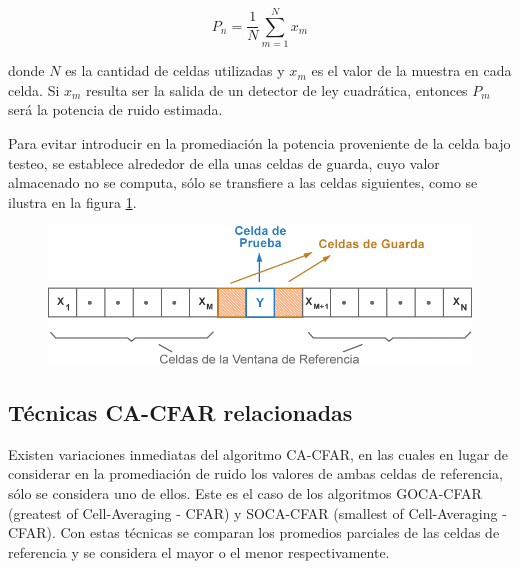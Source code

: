 \begin{equation}
P_{n} = \dfrac{1}{N} \sum_{m=1}^{N} x_m
\end{equation}

donde \(N\) es la cantidad de celdas utilizadas y \(x_{m}\) es el valor de la muestra en cada celda. Si \(x_{m}\) resulta ser la salida de un detector de ley cuadrática, entonces \(P_{m}\) será la potencia de ruido estimada.

Para evitar introducir en la promediación la potencia proveniente de la celda bajo testeo, se establece alrededor de ella unas celdas de guarda, cuyo valor almacenado no se computa, sólo se transfiere a las celdas siguientes, como se ilustra en la figura \ref{estructura_cfar}.


\begin{figure}
\centering
\includegraphics[scale=0.5]{./Figures/Estructura-del-Esquema-CA-CFAR.png}
\label{estructura_cfar}
\end{figure}

\subsection{Técnicas CA-CFAR relacionadas}

Existen variaciones inmediatas del algoritmo CA-CFAR, en las cuales en lugar de considerar en la promediación de ruido los valores de ambas celdas de referencia, sólo se considera uno de ellos. Este es el caso de los algoritmos GOCA-CFAR (greatest of Cell-Averaging - CFAR) y SOCA-CFAR (smallest of Cell-Averaging - CFAR). Con estas técnicas se comparan los promedios parciales de las celdas de referencia y se considera el mayor o el menor respectivamente.

